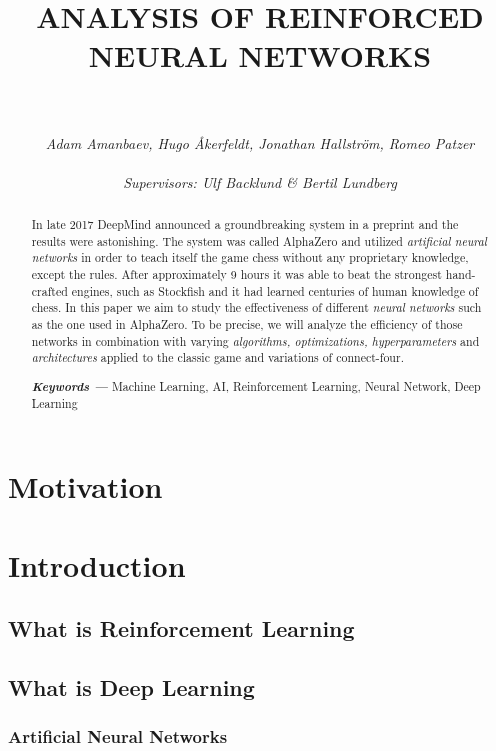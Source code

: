 \documentclass[titlepage]{article}
\title{\textbf{ANALYSIS OF REINFORCED \\NEURAL NETWORKS}}
\author{\rule{8cm}{0.3mm} \\[0.5in] \textit{Adam Amanbaev, Hugo Åkerfeldt, Jonathan Hallström, Romeo Patzer} \\\\
    \small \textit{Supervisors: Ulf Backlund \& Bertil Lundberg}
}
\date{}
\providecommand{\keywords}[1] {
    \small
    \textbf{\textit{Keywords ---}} #1
}
\begin{document}
\maketitle

\newpage

\begin{abstract}
    In late 2017 DeepMind announced a groundbreaking system in a preprint \cite{alphazero} and the results were astonishing. The system was called AlphaZero and utilized \emph{artificial neural networks} in order to teach itself the game chess without any proprietary knowledge, except the rules. After approximately 9 hours it was able to beat the strongest hand-crafted engines, such as Stockfish and it had learned centuries of human knowledge of chess. In this paper we aim to study the effectiveness of different \emph{neural networks} such as the one used in AlphaZero. To be precise, we will analyze the efficiency of those networks in combination with varying \emph{algorithms, optimizations, hyperparameters} and \emph {architectures} applied to the classic game and variations of connect-four. \\[0.5in]
\centerline{\keywords{Machine Learning, AI, Reinforcement Learning, Neural Network, Deep Learning}}
\end{abstract}

\tableofcontents

\newpage

\section{Motivation}

\newpage

\section{Introduction}

\subsection{What is Reinforcement Learning}
\subsection{What is Deep Learning}
\subsubsection{Artificial Neural Networks}
\end{document}
